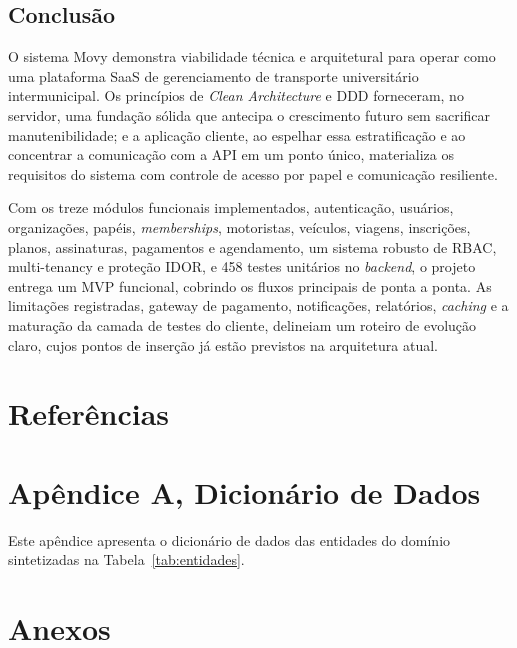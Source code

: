 \documentclass[12pt,openright,oneside,a4paper]{article}
\begin{document}
\subsection{Conclusão}

O sistema Movy demonstra viabilidade técnica e arquitetural para operar como uma plataforma SaaS de gerenciamento de transporte universitário intermunicipal. Os princípios de \textit{Clean Architecture} e DDD forneceram, no servidor, uma fundação sólida que antecipa o crescimento futuro sem sacrificar manutenibilidade; e a aplicação cliente, ao espelhar essa estratificação e ao concentrar a comunicação com a API em um ponto único, materializa os requisitos do sistema com controle de acesso por papel e comunicação resiliente.

Com os treze módulos funcionais implementados, autenticação, usuários, organizações, papéis, \textit{memberships}, motoristas, veículos, viagens, inscrições, planos, assinaturas, pagamentos e agendamento, um sistema robusto de RBAC, multi-tenancy e proteção IDOR, e 458 testes unitários no \textit{backend}, o projeto entrega um MVP funcional, cobrindo os fluxos principais de ponta a ponta. As limitações registradas, gateway de pagamento, notificações, relatórios, \textit{caching} e a maturação da camada de testes do cliente, delineiam um roteiro de evolução claro, cujos pontos de inserção já estão previstos na arquitetura atual.

\newpage
\renewcommand{\refname}{}
{}
\section*{Referências}




\newpage
{}
{}
\section*{Apêndice A, Dicionário de Dados}

Este apêndice apresenta o dicionário de dados das entidades do domínio sintetizadas na Tabela~\ref{tab:entidades}.



\newpage
\section{Anexos}


\end{document}
